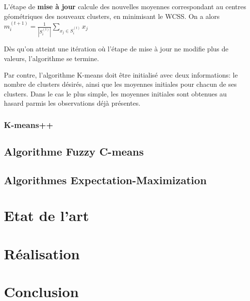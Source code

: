 \documentclass{article}
\begin{document}
      L'étape de \textbf{mise à jour} calcule des nouvelles moyennes correspondant au centres géométriques des nouveaux clusters, en minimisant le WCSS. On a alors $m_i^{(t+1)}=\frac{1}{|S_i^{(t)}|}\sum_{x_j\in S_i^{(t)}}x_j$
      
      Dès qu'on atteint une itération où l'étape de mise à jour ne modifie plus de valeurs, l'algorithme se termine.
      
      Par contre, l'algorithme K-means doit être initialisé avec deux informations: le nombre de clusters désirés, ainsi que les moyennes initiales pour chacun de ses clusters. Dans le cas le plus simple, les moyennes initiales sont obtenues au hasard parmis les observations déjà présentes.
      
      \subsubsection{K-means++}
    
    \subsection{Algorithme Fuzzy C-means}
    
    \subsection{Algorithmes Expectation-Maximization}
  
  \section{Etat de l'art}
  
  \section{Réalisation}
  
  \section{Conclusion}


\nocite{*}
\end{document}
